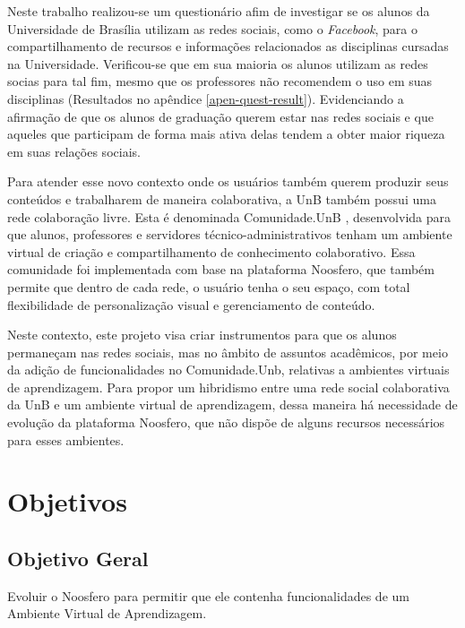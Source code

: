 Neste trabalho realizou-se um questionário afim de investigar se os alunos da Universidade de Brasília utilizam as redes sociais, como o \textit{Facebook}, para o compartilhamento de recursos e informações relacionados as disciplinas cursadas na Universidade. Verificou-se que em sua maioria os alunos utilizam as redes socias para tal fim, mesmo que os professores não recomendem o uso em suas disciplinas (Resultados no apêndice \ref{apen-quest-result}). Evidenciando a afirmação de  que os alunos de graduação querem estar nas redes sociais e que aqueles que participam de forma mais ativa delas tendem a obter maior riqueza em suas relações sociais.

Para atender esse novo contexto onde os usuários também querem produzir seus conteúdos e trabalharem de maneira colaborativa, a UnB também possui uma rede colaboração livre. Esta é denominada Comunidade.UnB , desenvolvida para que alunos, professores e servidores técnico-administrativos tenham um ambiente virtual de criação e compartilhamento de conhecimento colaborativo. Essa comunidade foi implementada com base na plataforma Noosfero, que também permite que dentro de cada rede, o usuário tenha o seu espaço, com total flexibilidade de personalização visual e gerenciamento de conteúdo.

Neste contexto, este projeto visa criar instrumentos para que os alunos permaneçam nas redes sociais, mas no âmbito de assuntos acadêmicos, por meio da adição de funcionalidades no Comunidade.Unb, relativas a ambientes virtuais de aprendizagem. Para propor um hibridismo entre uma rede social colaborativa da UnB e um ambiente virtual de aprendizagem, dessa maneira há necessidade de evolução da plataforma Noosfero, que não dispõe de alguns recursos necessários para esses ambientes.

\section{Objetivos}

\subsection{Objetivo Geral}

Evoluir o Noosfero para permitir que ele contenha funcionalidades de um Ambiente Virtual de Aprendizagem.

